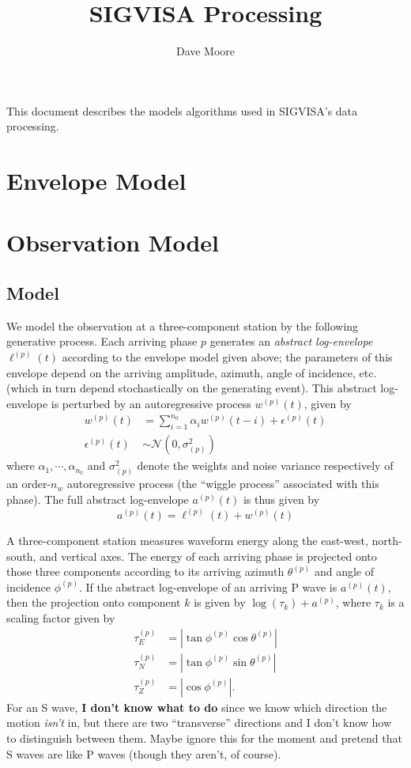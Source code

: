 \documentclass{article}
\begin{document}
\title{SIGVISA Processing}
\author{Dave Moore}
\date{}

This document describes the models algorithms used in SIGVISA's data processing. 

\section{Envelope Model}

\section{Observation Model}

\subsection{Model}
We model the observation at a three-component station by the following generative process. Each arriving phase $p$ generates an {\em abstract log-envelope} $\ell^{(p)}(t)$ according to the envelope model given above; the parameters of this envelope depend on the arriving amplitude, azimuth, angle of incidence, etc. (which in turn depend stochastically on the generating event). This abstract log-envelope is perturbed by an autoregressive process $w^{(p)}(t)$, given by 
\begin{align*}
w^{(p)}(t) &= \sum_{i=1}^{n_0} \alpha_i w^{(p)}(t-i) + \epsilon^{(p)}(t)\\
\epsilon^{(p)}(t) &\sim \mathcal{N}(0, \sigma_{(p)}^2)
\end{align*}
where $\alpha_1, \cdots, \alpha_{n_0}$ and $\sigma_{(p)}^2$ denote the weights and noise variance respectively of an order-$n_w$ autoregressive process (the ``wiggle process'' associated with this phase). The full abstract log-envelope $a^{(p)}(t)$ is thus given by
\[a^{(p)}(t) = \ell^{(p)}(t) + w^{(p)}(t)\]

A three-component station measures waveform energy along the east-west, north-south, and vertical axes. The energy of each arriving phase is projected onto those three components according to its arriving azimuth $\theta^{(p)}$ and angle of incidence $\phi^{(p)}$. If the abstract log-envelope of an arriving P wave is $a^{(p)}(t)$, then the projection onto component $k$ is given by $\log(\tau_k) + a^{(p)}$, where $\tau_k$ is a scaling factor given by
\begin{align*}
\tau^{(p)}_E &= |\tan \phi^{(p)} \cos\theta^{(p)}|\\
\tau^{(p)}_N &= |\tan \phi^{(p)} \sin\theta^{(p)}|\\
\tau^{(p)}_Z &=|\cos \phi^{(p)}|.
\end{align*}
For an S wave, {\bf I don't know what to do} since we know which direction the motion {\em isn't} in, but there are two ``transverse'' directions and I don't know how to distinguish between them. Maybe ignore this for the moment and pretend that S waves are like P waves (though they aren't,  of course). 
\end{document}
